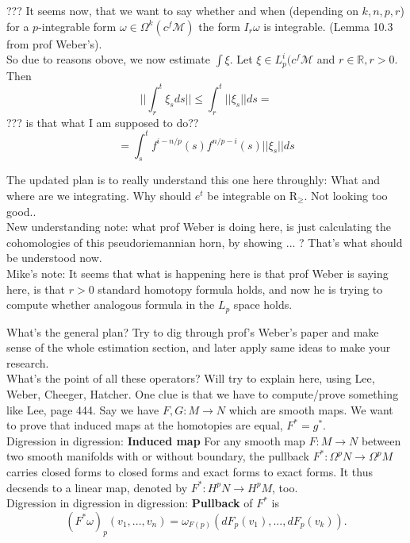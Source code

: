 \documentclass[licencjacka]{pracamgr}
\theoremstyle{definition}
\theoremstyle{remark}
\begin{document}
??? It seems now, that we want to say whether and when (depending on
$k, n, p, r$) for a $p$-integrable form $\omega \in \Omega^k(c^f\mathcal{M})$
the form $I_r\omega$ is integrable. (Lemma 10.3 from prof Weber's). \\

So due to reasons obove, we now estimate $\int \xi$. Let $\xi \in
L_p^i(c^f\mathcal{M}$ and $ r \in \mathbb{R}, r > 0$. Then
\[
    ||\int_r^t \xi_s ds || \leq \int_r^t ||\xi_s||ds =
\]
??? is that what I am supposed to do??
\[
    = \int_s^t f^{i-n/p}(s) f^{n/p-i}(s) ||\xi_s||ds
\]


The updated plan is to really understand this one here throughly:
What and where are we integrating. Why should $e^t$ be integrable 
on $\mathrm{R}_\geq$. Not looking too good.. \\

New understanding note: what prof Weber is doing here, is just calculating the 
cohomologies of this pseudoriemannian horn, by showing ... ? That's what should
be understood now. \\



\scriptsize
Mike's note:
It seems that what is happening here is that prof Weber is saying here,
is that $r>0$ standard homotopy formula holds, and now he is trying
to compute whether analogous formula in the $L_p$ space holds.


What's the general plan? Try to dig through prof's Weber's paper and
make sense of the whole estimation section, and later apply same ideas
to make your research. \\

What's the point of all these operators? Will try to
explain here, using Lee, Weber, Cheeger, Hatcher.  One clue is that we
have to compute/prove something like Lee, page 444.  Say we have $F,G:
M \rightarrow N$ which are smooth maps. We want to prove that induced
maps at the homotopies are equal, $F^\ast = g^\ast$. \\

Digression in digression: \textbf{Induced map} For any smooth map $F:
M \rightarrow N$ between two smooth manifolds with or without
boundary, the pullback $F^\ast: \Omega^p N \rightarrow \Omega^p M$
carries closed forms to closed forms and exact forms to exact
forms. It thus decsends to a linear map, denoted by $F^\ast: H^p N
\rightarrow H^p M$, too. \\

Digression in digression in digression: \textbf{Pullback} of $F^\ast$ is
\[
    (F^\ast \omega)_p(v_1, ..., v_n) =
        \omega_{F(p)}(dF_p(v_1), ..., dF_p(v_k)).
\] \\
\end{document}
